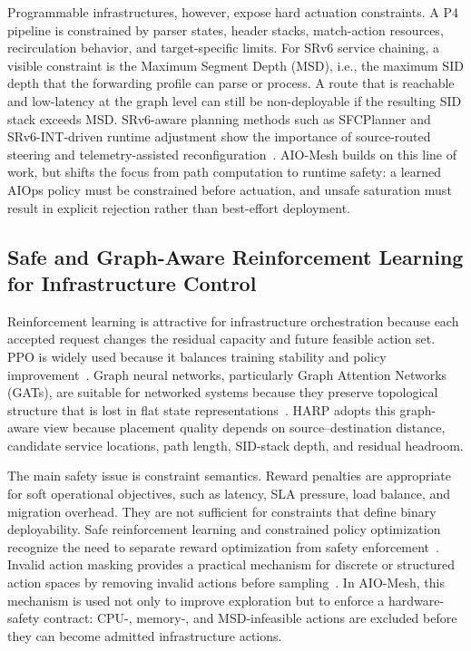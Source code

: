 \documentclass[final,5p]{elsarticle}
\begin{document}
Programmable infrastructures, however, expose hard actuation constraints. A P4 pipeline is constrained by parser states, header stacks, match-action resources, recirculation behavior, and target-specific limits. For SRv6 service chaining, a visible constraint is the Maximum Segment Depth (MSD), i.e., the maximum SID depth that the forwarding profile can parse or process. A route that is reachable and low-latency at the graph level can still be non-deployable if the resulting SID stack exceeds MSD. SRv6-aware planning methods such as SFCPlanner and SRv6-INT-driven runtime adjustment show the importance of source-routed steering and telemetry-assisted reconfiguration~\cite{qiu2024sfcplanner,yan2024srv6int}. AIO-Mesh builds on this line of work, but shifts the focus from path computation to runtime safety: a learned AIOps policy must be constrained before actuation, and unsafe saturation must result in explicit rejection rather than best-effort deployment.

\subsection{Safe and Graph-Aware Reinforcement Learning for Infrastructure Control}
\label{subsec:related_safe_rl}

Reinforcement learning is attractive for infrastructure orchestration because each accepted request changes the residual capacity and future feasible action set. PPO is widely used because it balances training stability and policy improvement~\cite{schulman2017proximal}. Graph neural networks, particularly Graph Attention Networks (GATs), are suitable for networked systems because they preserve topological structure that is lost in flat state representations~\cite{velickovic2018graph}. HARP adopts this graph-aware view because placement quality depends on source--destination distance, candidate service locations, path length, SID-stack depth, and residual headroom.

The main safety issue is constraint semantics. Reward penalties are appropriate for soft operational objectives, such as latency, SLA pressure, load balance, and migration overhead. They are not sufficient for constraints that define binary deployability. Safe reinforcement learning and constrained policy optimization recognize the need to separate reward optimization from safety enforcement~\cite{gu2024safe,ma2022conservative}. Invalid action masking provides a practical mechanism for discrete or structured action spaces by removing invalid actions before sampling~\cite{huang2022closer}. In AIO-Mesh, this mechanism is used not only to improve exploration but to enforce a hardware-safety contract: CPU-, memory-, and MSD-infeasible actions are excluded before they can become admitted infrastructure actions.
\end{document}
